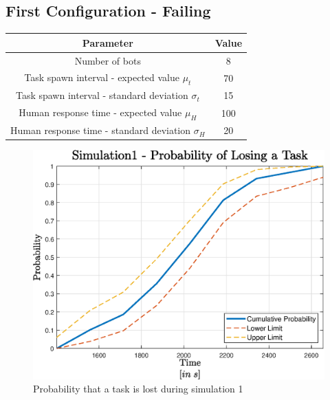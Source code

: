 \documentclass[10pt,a4paper]{article}
\begin{document}
		\subsection{First Configuration - Failing}
			\label{sub:sim1}
			\begin{center}
				\begin{tabular}{ |c|c|}
					\hline
					Parameter & Value \\
					\hline
					\hline
					Number of bots & 8\\
					\hline
					Task spawn interval - expected value $\mu_t$ & 70\\
					\hline					
					Task spawn interval - standard deviation $\sigma_t$ & 15\\
					\hline
					Human response time - expected value $\mu_H$ & 100\\
					\hline					
					Human response time - standard deviation $\sigma_H$ & 20\\
					\hline
				\end{tabular}
			\end{center}
			\begin{figure}[H]
				\centering
					\includegraphics[scale = 0.7]{Images/Simulation1}
					\caption{Probability that a task is lost during simulation 1}
					\label{fig:sim1}
			\end{figure}
		
\end{document}
